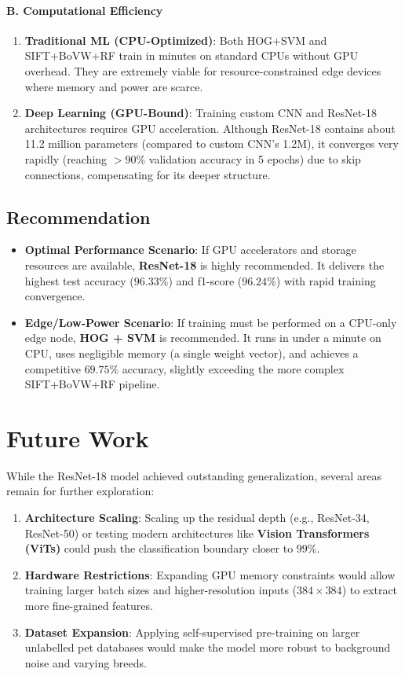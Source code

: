 \documentclass[12pt,a4paper]{article}
\begin{document}
\paragraph{B. Computational Efficiency}
\begin{enumerate}
    \item \textbf{Traditional ML (CPU-Optimized)}: Both HOG+SVM and SIFT+BoVW+RF train in minutes on standard CPUs without GPU overhead. They are extremely viable for resource-constrained edge devices where memory and power are scarce.
    \item \textbf{Deep Learning (GPU-Bound)}: Training custom CNN and ResNet-18 architectures requires GPU acceleration. Although ResNet-18 contains about 11.2 million parameters (compared to custom CNN's 1.2M), it converges very rapidly (reaching $>90\%$ validation accuracy in 5 epochs) due to skip connections, compensating for its deeper structure.
\end{enumerate}

\subsection{Recommendation}
\begin{itemize}
    \item \textbf{Optimal Performance Scenario}: If GPU accelerators and storage resources are available, \textbf{ResNet-18} is highly recommended. It delivers the highest test accuracy ($96.33\%$) and f1-score ($96.24\%$) with rapid training convergence.
    \item \textbf{Edge/Low-Power Scenario}: If training must be performed on a CPU-only edge node, \textbf{HOG + SVM} is recommended. It runs in under a minute on CPU, uses negligible memory (a single weight vector), and achieves a competitive $69.75\%$ accuracy, slightly exceeding the more complex SIFT+BoVW+RF pipeline.
\end{itemize}

\section{Future Work}
While the ResNet-18 model achieved outstanding generalization, several areas remain for further exploration:
\begin{enumerate}
    \item \textbf{Architecture Scaling}: Scaling up the residual depth (e.g., ResNet-34, ResNet-50) or testing modern architectures like \textbf{Vision Transformers (ViTs)} could push the classification boundary closer to $99\%$.
    \item \textbf{Hardware Restrictions}: Expanding GPU memory constraints would allow training larger batch sizes and higher-resolution inputs ($384 \times 384$) to extract more fine-grained features.
    \item \textbf{Dataset Expansion}: Applying self-supervised pre-training on larger unlabelled pet databases would make the model more robust to background noise and varying breeds.
\end{enumerate}
\end{document}
